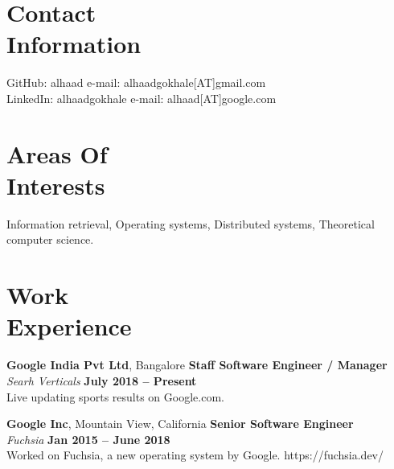 \documentclass[margin,line]{resume}
\begin{document}
\begin{resume}

    \section{\mysidestyle Contact\\Information}

    GitHub: alhaad                            \hfill e-mail: alhaadgokhale[AT]gmail.com          \vspace{0mm}\\\vspace{0mm}%
    LinkedIn: alhaadgokhale                   \hfill e-mail: alhaad[AT]google.com  \vspace{0mm}\\\vspace{-4.5mm}%


    \section{\mysidestyle Areas Of\\Interests}

    Information retrieval, Operating systems, Distributed systems, Theoretical computer science.

    \section{\mysidestyle Work\\Experience}

    \textbf{Google India Pvt Ltd}, Bangalore \hfill \textbf{Staff Software Engineer / Manager} \vspace{2mm}\\\vspace{1mm}%
    \textsl{Searh Verticals} \hfill \textbf{July 2018 -- Present}\\
    Live updating sports results on Google.com.
 
    \textbf{Google Inc}, Mountain View, California \hfill \textbf{Senior Software Engineer} \vspace{2mm}\\\vspace{1mm}%
    \textsl{Fuchsia} \hfill \textbf{Jan 2015 -- June 2018}\\
    Worked on Fuchsia, a new operating system by Google.
    https://fuchsia.dev/


\end{resume}
\end{document}
